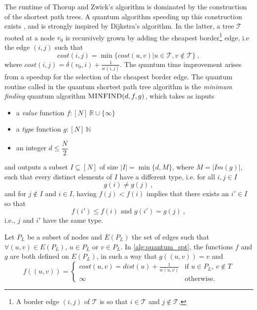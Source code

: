 The runtime of Thorup and Zwick's algorithm is dominated by the construction of the shortest path trees.  A quantum algorithm speeding up this construction exists \cite{Durr_Heiligman_2006}, and is strongly inspired by Dijkstra's algorithm.
In the latter, a tree $\mathcal{T}$ rooted at a node $v_0$ is recursively grown by adding the cheapest border\footnote{A border edge $(i,j)$ of $\mathcal T$ is so that $i\in \mathcal T$ and $j \notin \mathcal T$.} edge, i.e the edge $(i,j)$ such that
\begin{equation*}
    cost(i,j)= \min\{ cost(u,v) | u\in\mathcal{T},v\notin \mathcal{T}\} \ ,
\end{equation*}
where $cost(i,j) = \delta(v_0,i) + \frac{1}{w(i,j)}$. The quantum time improvement arises from a speedup for the selection of the cheapest border edge.
The quantum routine called in the quantum shortest path tree algorithm is the \textit{minimum finding} quantum algorithm
$\textsc{MINFIND}(d,f,g)$, which takes as inputs
\begin{itemize}%
    \item a \textit{value} function $f : [N] \> \mathbb{R} \cup \{\infty\}$
    \item a \textit{type} function $g : [N] \> \mathbb{N}$
    \item an integer $d \leq \dfrac N2$
\end{itemize}
and outputs a subset $I \subseteq [N]$ of size $|I| = \min\{d,M\}$, where $M = |Im(g)|$, such that
every distinct elements of $I$ have a different type, i.e. for all $i,j \in I$ $$g(i) \neq g(j)\ ,$$
and for $ j\notin I$ and $i \in I$, having $f(j)<f(i)$ implies that there exists an $ i' \in I$ so that
$$ f(i')\leq f(i) \text{ and } g(i')= g(j)\ ,$$
i.e., $j$ and $i'$ have the same type.

Let $P_L$ be a subset of nodes and $E(P_L)$ the set of edges such that $\forall (u,v) \in E(P_L)$, $u \in P_L \text{ or } v \in P_L$.
In \autoref{alg:quantum_spt}, %
the functions $f$ and $g$ are both defined on $E(P_L)$, in such a way that $g((u,v)) = v$ and
\begin{equation*}
    f((u,v)) = \begin{cases}
        cost(u,v)=dist(u) + \frac{1}{w(u,v)} & \text{if } u\in P_L,\, v\notin T \\
        \infty & \text{otherwise.}
    \end{cases}
\end{equation*}

